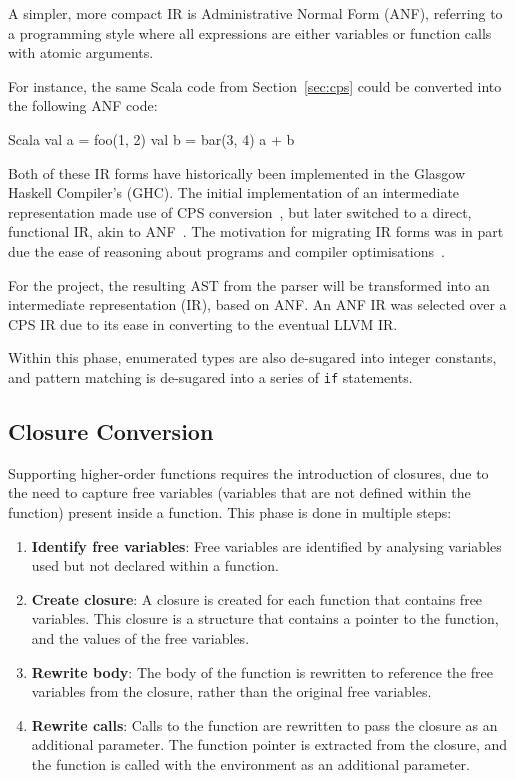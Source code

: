 A simpler, more compact IR is Administrative Normal Form (ANF), referring to a programming style
where all expressions are either variables or function calls with atomic arguments.

For instance, the same Scala code from Section~\ref{sec:cps} could be converted into the following
ANF code:

\begin{code}{Scala}
    val a = foo(1, 2)
    val b = bar(3, 4)
    a + b
\end{code}

Both of these IR forms have historically been implemented in the Glasgow Haskell Compiler's (GHC).
The initial implementation of an intermediate representation made use of CPS
conversion~\autocite{ghccps}, but later switched to a direct, functional IR, akin to
ANF~\autocite{ghcanf}. The motivation for migrating IR forms was in part due the ease of reasoning
about programs and compiler optimisations~\autocite{maurer2017compiling}.

For the project, the resulting AST from the parser will be transformed into an intermediate
representation (IR), based on ANF. An ANF IR was selected over a CPS IR due to its ease in
converting to the eventual LLVM IR.

Within this phase, enumerated types are also de-sugared into integer constants, and pattern matching
is de-sugared into a series of \texttt{if} statements.

\subsection{Closure Conversion}

Supporting higher-order functions requires the introduction of closures, due to the need to capture
free variables (variables that are not defined within the function) present inside a function. This
phase is done in multiple steps:

\begin{enumerate}
      \item \textbf{Identify free variables}: Free variables are identified by analysing variables
            used but not declared within a function.

      \item \textbf{Create closure}: A closure is created for each function that contains free
            variables. This closure is a structure that contains a pointer to the function, and the
            values of the free variables.

      \item \textbf{Rewrite body}: The body of the function is rewritten to reference the free
            variables from the closure, rather than the original free variables.

      \item \textbf{Rewrite calls}: Calls to the function are rewritten to pass the closure as an
            additional parameter. The function pointer is extracted from the closure, and the
            function is called with the environment as an additional parameter.
\end{enumerate}

